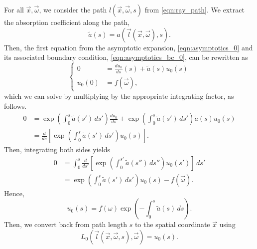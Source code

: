 For all $\vec{x}, \vec{\omega}$, we consider the path $l(\vec{x}, \vec{\omega}, s)$ from \eqref{eqn:ray_path}.
We extract the absorption coefficient along the path,
\begin{equation*}
  \tilde{a}(s) = a(\vec{l}(\vec{x}, \vec{\omega}), s).
\end{equation*}
Then, the first equation from the asymptotic expansion, \eqref{eqn:asymptotics_0} and its associated boundary condition, \eqref{eqn:asymptotics_bc_0}, can be rewritten as
\begin{equation*}
  \left\{
  \begin{aligned}
  0 &= \frac{du_0}{ds}(s) + \tilde{a}(s) u_0(s) \\
  u_0(0) &= f(\vec{\omega}),
  \end{aligned}
  \right.
\end{equation*}
which we can solve by multiplying by the appropriate integrating factor, as follows.
\begin{align*}
  0 &= \exp\left(\int_0^s \tilde{a}(s')\, ds'\right) \frac{du_0}{ds} + \exp\left(\int_0^s \tilde{a}(s')\, ds'\right) \tilde{a}(s) u_0(s) \\
  &= \frac{d}{ds}\left[\exp\left(\int_0^s \tilde{a}(s')\, ds'\right) u_0(s)\right].
\end{align*}
Then, integrating both sides yields
\begin{align*}
  0 &= \int_0^s \frac{d}{ds'}\left[\exp\left(\int_0^{s'} \tilde{a}(s'')\, ds''\right) u_0(s')\right]\, ds' \\
  &= \exp\left(\int_0^s \tilde{a}(s')\, ds'\right) u_0(s) - f(\vec{\omega}).
\end{align*}
Hence,
\begin{equation}
  u_0(s) = f(\omega) \exp\left(-\int_0^s \tilde{a}(s)\, ds\right).
  \label{eqn:asymptotics_soln_0}
\end{equation}
Then, we convert back from path length $s$ to the spatial coordinate $\vec{x}$ using
\begin{equation*}
  L_0(\vec{l}(\vec{x}, \vec{\omega},s), \vec{\omega}) = u_0(s).
\end{equation*}

